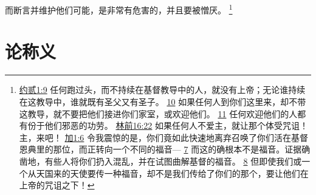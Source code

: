 \documentclass[12pt, a4paper, oneside]{ctexart}
\begin{document}
	而断言并维护他们可能，是非常有危害的，并且要被憎厌。
	\footnote {
		\href{https://biblehub.com/2_john/1-9.htm}{约贰1:9} 任何跑过头，而不持续在基督教导中的人，就没有上帝；无论谁持续在这教导中，谁就既有圣父又有圣子。
		\href{https://biblehub.com/2_john/1-10.htm}{10} 如果任何人到你们这里来，却不带这教导，就不要把他们接进你们家室，或欢迎他们。
		\href{https://biblehub.com/2_john/1-11.htm}{11} 任何欢迎他们的人都有份于他们邪恶的功劳。
		\href{https://biblehub.com/1_corinthians/16-22.htm}{林前16:22} 如果任何人不爱主，就让那个体受咒诅！主，来吧！
		\href{https://biblehub.com/galatians/1-6.htm}{加1:6} 令我震惊的是，你们竟如此快速地离弃召唤了你们活在基督恩典里的那位，而正转向一个不同的福音---
		\href{https://biblehub.com/galatians/1-7.htm}{7} 而这的确根本不是福音。证据确凿地，有些人将你们扔入混乱，并在试图曲解基督的福音。
		\href{https://biblehub.com/galatians/1-8.htm}{8} 但即使我们或一个从天国来的天使要传一种福音，却不是我们传给了你们的那个，要让他们在上帝的咒诅之下！
	}

\section{论称义}
\end{document}

